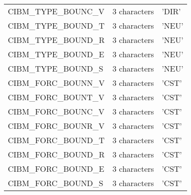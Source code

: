 \begin{longtable} {|p{}|p{}|p{}|}
CIBM\_TYPE\_BOUNC\_V & 3 characters  & 'DIR'         \\
CIBM\_TYPE\_BOUND\_T & 3 characters  & 'NEU'         \\
CIBM\_TYPE\_BOUND\_R & 3 characters  & 'NEU'         \\
CIBM\_TYPE\_BOUND\_E & 3 characters  & 'NEU'         \\
CIBM\_TYPE\_BOUND\_S & 3 characters  & 'NEU'         \\\hline
CIBM\_FORC\_BOUNN\_V & 3 characters  & 'CST'         \\
CIBM\_FORC\_BOUNT\_V & 3 characters  & 'CST'         \\
CIBM\_FORC\_BOUNC\_V & 3 characters  & 'CST'         \\
CIBM\_FORC\_BOUNR\_V & 3 characters  & 'CST'         \\
CIBM\_FORC\_BOUND\_T & 3 characters  & 'CST'         \\
CIBM\_FORC\_BOUND\_R & 3 characters  & 'CST'         \\
CIBM\_FORC\_BOUND\_E & 3 characters  & 'CST'         \\
CIBM\_FORC\_BOUND\_S & 3 characters  & 'CST'         \\
\end{longtable}

